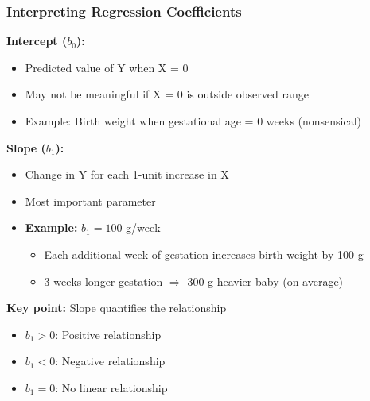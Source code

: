 \documentclass{beamer}
\begin{document}
\begin{frame}
\frametitle{Interpreting Regression Coefficients}
\textbf{Intercept ($b_0$):}
\begin{itemize}
\item Predicted value of Y when X = 0
\item May not be meaningful if X = 0 is outside observed range
\item Example: Birth weight when gestational age = 0 weeks (nonsensical)
\end{itemize}

\vspace{0.5cm}
\textbf{Slope ($b_1$):}
\begin{itemize}
\item Change in Y for each 1-unit increase in X
\item Most important parameter
\item \textbf{Example:} $b_1 = 100$ g/week
  \begin{itemize}
  \item Each additional week of gestation increases birth weight by 100 g
  \item 3 weeks longer gestation $\Rightarrow$ 300 g heavier baby (on average)
  \end{itemize}
\end{itemize}

\vspace{0.5cm}
\textbf{Key point:} Slope quantifies the relationship
\begin{itemize}
\item $b_1 > 0$: Positive relationship
\item $b_1 < 0$: Negative relationship
\item $b_1 = 0$: No linear relationship
\end{itemize}
\end{frame}
\end{document}
